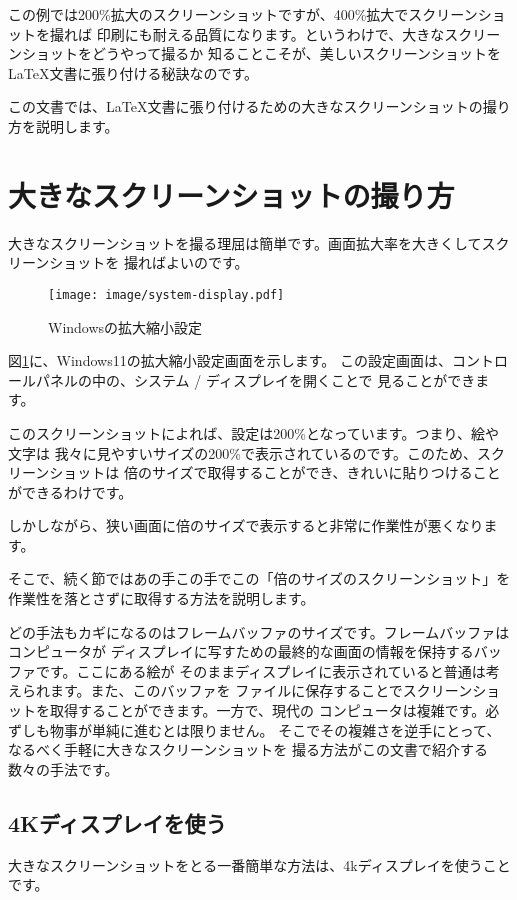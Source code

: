 この例では200\%拡大のスクリーンショットですが、400\%拡大でスクリーンショットを撮れば
印刷にも耐える品質になります。というわけで、大きなスクリーンショットをどうやって撮るか
知ることこそが、美しいスクリーンショットを\LaTeX 文書に張り付ける秘訣なのです。

この文書では、\LaTeX 文書に張り付けるための大きなスクリーンショットの撮り方を説明します。

\section{大きなスクリーンショットの撮り方}
大きなスクリーンショットを撮る理屈は簡単です。画面拡大率を大きくしてスクリーンショットを
撮ればよいのです。

\begin{figure}[bp]
  \begin{center}
    \texttt{[image: image/system-display.pdf]}
    \caption{Windowsの拡大縮小設定} \label{fig:system-display}
  \end{center}
\end{figure}

図\ref{fig:system-display}に、Windows11の拡大縮小設定画面を示します。
この設定画面は、コントロールパネルの中の、システム / ディスプレイを開くことで
見ることができます。

このスクリーンショットによれば、設定は200\%となっています。つまり、絵や文字は
我々に見やすいサイズの200\%で表示されているのです。このため、スクリーンショットは
倍のサイズで取得することができ、きれいに貼りつけることができるわけです。

しかしながら、狭い画面に倍のサイズで表示すると非常に作業性が悪くなります。

そこで、続く節ではあの手この手でこの「倍のサイズのスクリーンショット」を
作業性を落とさずに取得する方法を説明します。

どの手法もカギになるのはフレームバッファのサイズです。フレームバッファはコンピュータが
ディスプレイに写すための最終的な画面の情報を保持するバッファです。ここにある絵が
そのままディスプレイに表示されていると普通は考えられます。また、このバッファを
ファイルに保存することでスクリーンショットを取得することができます。一方で、現代の
コンピュータは複雑です。必ずしも物事が単純に進むとは限りません。
そこでその複雑さを逆手にとって、なるべく手軽に大きなスクリーンショットを
撮る方法がこの文書で紹介する数々の手法です。

\subsection{4Kディスプレイを使う}
大きなスクリーンショットをとる一番簡単な方法は、4kディスプレイを使うことです。

